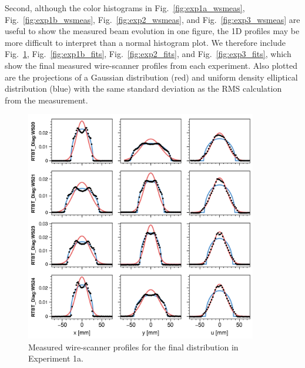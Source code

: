 Second, although the color histograms in Fig.~\ref{fig:exp1a_wsmeas}, Fig.~\ref{fig:exp1b_wsmeas}, Fig.~\ref{fig:exp2_wsmeas}, and Fig.~\ref{fig:exp3_wsmeas} are useful to show the measured beam evolution in one figure, the 1D profiles may be more difficult to interpret than a normal histogram plot. We therefore include Fig.~\ref{fig:exp1a_fits}, Fig.~\ref{fig:exp1b_fits}, Fig.~\ref{fig:exp2_fits}, and Fig.~\ref{fig:exp3_fits}, which show the final measured wire-scanner profiles from each experiment. Also plotted are the projections of a Gaussian distribution (red) and uniform density elliptical distribution (blue) with the same standard deviation as the RMS calculation from the measurement. 
%
\begin{figure}[!p]
    \centering
    \includegraphics[width=0.9\textwidth]{Images/chapter5/exp1a/fits_9.png}
    \caption{Measured wire-scanner profiles for the final distribution in Experiment 1a.}
    \label{fig:exp1a_fits}
\end{figure}
%
